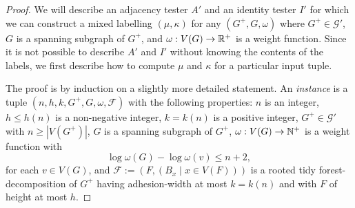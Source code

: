 \documentclass{patmorin}
\renewcommand{\le}{\leqslant}
\renewcommand{\geq}{\geqslant}
\newcommand{\defin}[1]{\emph{\textcolor{brightmaroon}{#1}}}
\begin{document}
\begin{proof}
  We will describe an adjacency tester $A'$ and an identity tester $I'$ for which we can construct a mixed labelling $(\mu,\kappa)$ for any $(G^+,G,\omega)$ where $G^+\in\mathcal{G}'$, $G$ is a spanning subgraph of $G^+$, and $\omega:V(G)\to\mathbb{R}^+$ is a weight function.
  Since it is not possible to describe $A'$ and $I'$ without knowing the contents of the labels, we first describe how to compute $\mu$ and $\kappa$ for a particular input tuple.

  The proof is by induction on a slightly more detailed statement. An \defin{instance} is a tuple $(n,h,k,G^+,G,\omega,\mathcal{F})$ with the following properties:
  $n$ is an integer,
  $h\le h(n)$ is a non-negative integer,
  $k=k(n)$ is a positive integer,
  $G^+\in\mathcal{G}'$ with $n\geq |V(G^+)|$,
  $G$ is a spanning subgraph of $G^+$,
  $\omega:V(G)\to\mathbb{N}^+$
  is a weight function with
  \begin{equation}
    \log\omega(G)-\log \omega(v)\le n+2,
    \label{eq:short-td-nice-weights}
  \end{equation}
  for each $v\in V(G)$, and
  $\mathcal{F}:=(F,(B_x \mid x\in V(F)))$ is a rooted tidy forest-decomposition of $G^+$ having adhesion-width at most $k=k(n)$ and with $F$ of height at most $h$.


\end{proof}
\end{document}
